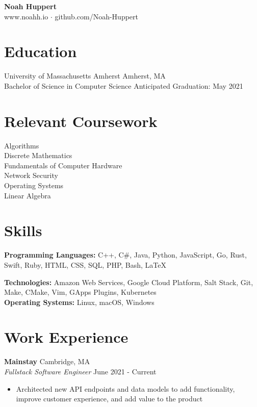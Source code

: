 \documentclass[10pt]{article}
\begin{document}

\centering
	\textbf{Noah Huppert} \\
	
	www.noahh.io $\cdot$ github.com/Noah-Huppert


\begin{flushleft}

\section{Education}
	University of Massachusetts Amherst \hfill Amherst, MA \\
	Bachelor of Science in Computer Science \hfill Anticipated Graduation: May 2021 \\

\section{Relevant Coursework}
	\begin{addmargin}[1em]{1em}
	\begin{multicols}{3}
		Algorithms \\
		Discrete Mathematics \\

		Fundamentals of Computer Hardware \\
		Network Security \\

		Operating Systems \\
		Linear Algebra 
	\end{multicols} 
	\end{addmargin}


\section{Skills}
	\textbf{Programming Languages:} C++, C\#, Java, Python, JavaScript, Go, Rust, Swift, Ruby, HTML, CSS, SQL, PHP,
		Bash, LaTeX

	\textbf{Technologies:} Amazon Web Services, Google Cloud Platform, Salt Stack, Git, Make, CMake, Vim,
		GApps Plugins, Kubernetes \\

	\textbf{Operating Systems:} Linux, macOS, Windows

    \section{Work Experience}
	\textbf{Mainstay} \hfill Cambridge, MA \\
	\textit{Fullstack Software Engineer} \hfill June 2021 - Current \\
    \begin{itemize}
        \item Architected new API endpoints and data models to add functionality, improve customer experience, and add value to the product


\end{itemize}
\end{flushleft}
\end{document}
